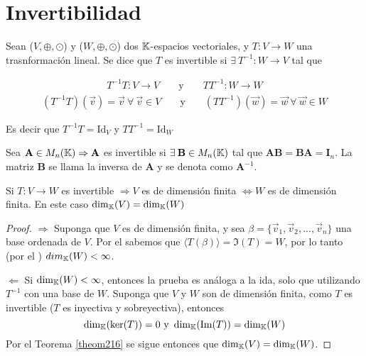 \section{Invertibilidad}

\begin{definition} [Invertible] \label{trans_inv}
    Sean ($V, \oplus, \odot$) y ($W, \oplus, \odot$)  dos $\mathbb{K}$-espacios vectoriales, y $T : V \to W$ una trasnformación lineal. Se dice que $T$ es invertible si $\exists \: {T}^{-1} : W \to V$ tal que 

    \begin{align*}
      {T}^{-1} T : V \to V  && \text{ y } && T{T}^{-1}  : W \to W
    \end{align*}
    \begin{align*}
      ({T}^{-1} T ) (\vec{v}) = \vec{v} \: \forall \: \vec{v} \in V && \text{ y } && (T{T}^{-1})(\vec{w}) = \vec{w} \: \forall \: \vec{w} \in W
    \end{align*}

    Es decir que ${T}^{-1} T = \mathrm{Id}_V$ y $ T {T}^{-1}  = \mathrm{Id}_W$ 
\end{definition}

\begin{definition} \label{mat_inv}
      Sea $\textbf{A} \in M_{n}(\mathbb{K}) \Rightarrow \textbf{A}$ es invertible si $\exists \: \textbf{B} \in M_{n}(\mathbb{K})$ tal que $\textbf{AB}=\textbf{BA}={\textbf{I}}_{n}$. La matriz $\textbf{B}$ se llama la inversa de $\textbf{A}$ y se denota como ${\textbf{A}}^{-1}$. 
\end{definition}

\begin{lemma} \label{lema211}
    Si $T : V \to W$ es invertible $\Rightarrow V$ es de dimensión finita $\iff W$ es de dimensión finita. En este caso ${\dim}_{\mathbb{K}}(V) = {\dim}_{\mathbb{K}}(W)$
\end{lemma}

\begin{proof}
    $\Rightarrow$ Suponga que $V$ es de dimensión finita, y sea $\beta=\{\vec{v}_1,\vec{v}_2,...,\vec{v}_n\}$ una base ordenada de $V$. Por el  sabemos que $\langle T(\beta) \rangle = \Im(T)=W$, por lo tanto (por el ) $dim_{\mathbb{K}}(W)<\infty$. 
    
    $\Leftarrow$ Si $\dim_{\mathbb{K}}(W) < \infty$, entonces la prueba es análoga a la ida, solo que utilizando $T^{-1}$ con una base de $W$. Suponga que $V$ y $W$ son de dimensión finita, como $T$ es invertible ($T$ es inyectiva y sobreyectiva), entonces $$\dim_{\K}(\ker(T))=0 \ \text{y} \ \dim_{\K}(\Im(T))=\dim_{\K}(W)$$ Por el Teorema \ref{theom216} se sigue entonces que $\dim_{\mathbb{K}}(V)=\dim_{\mathbb{K}}(W)$. 
\end{proof}

